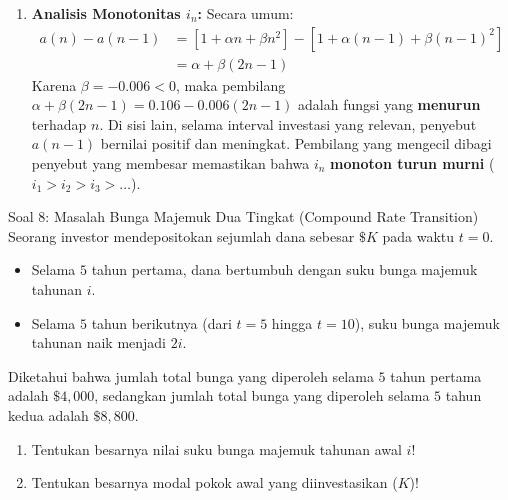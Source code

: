 \documentclass[11pt,a4paper]{article}
\begin{document}
\begin{solutionbox}[Soal 7]
\begin{enumerate}[label=(\alph*)]
    \item \textbf{Analisis Monotonitas $i_n$:}
    Secara umum:
    \begin{align*}
        a(n) - a(n-1) &= \left[1 + \alpha n + \beta n^2\right] - \left[1 + \alpha(n-1) + \beta(n-1)^2\right] \\
        &= \alpha + \beta(2n - 1)
    \end{align*}
    Karena $\beta = -0.006 < 0$, maka pembilang $\alpha + \beta(2n-1) = 0.106 - 0.006(2n-1)$ adalah fungsi yang \textbf{menurun} terhadap $n$. Di sisi lain, selama interval investasi yang relevan, penyebut $a(n-1)$ bernilai positif dan meningkat. Pembilang yang mengecil dibagi penyebut yang membesar memastikan bahwa $i_n$ \textbf{monoton turun murni} ($i_1 > i_2 > i_3 > \dots$).
\end{enumerate}
\end{solutionbox}

\vspace{1.2em}

\begin{problembox}{Soal 8: Masalah Bunga Majemuk Dua Tingkat (Compound Rate Transition)}
Seorang investor mendepositokan sejumlah dana sebesar $\$K$ pada waktu $t = 0$.
\begin{itemize}[leftmargin=1.5em]
    \item Selama $5$ tahun pertama, dana bertumbuh dengan suku bunga majemuk tahunan $i$.
    \item Selama $5$ tahun berikutnya (dari $t = 5$ hingga $t = 10$), suku bunga majemuk tahunan naik menjadi $2i$.
\end{itemize}
Diketahui bahwa jumlah total bunga yang diperoleh selama $5$ tahun pertama adalah $\$4{,}000$, sedangkan jumlah total bunga yang diperoleh selama $5$ tahun kedua adalah $\$8{,}800$.
\begin{enumerate}[label=(\alph*)]
    \item Tentukan besarnya nilai suku bunga majemuk tahunan awal $i$!
    \item Tentukan besarnya modal pokok awal yang diinvestasikan ($K$)!
\end{enumerate}
\end{problembox}
\end{document}
